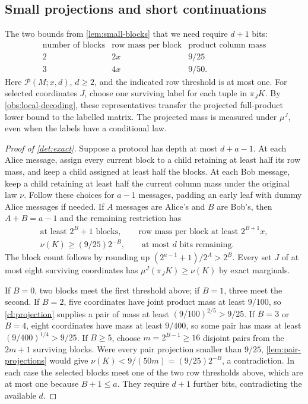 \documentclass[11pt]{article} \usepackage[utf8]{inputenc}
\theoremstyle{plain} \newtheorem{theorem}{Theorem}[section]
\theoremstyle{definition} \newaliascnt{definition}{theorem}
\newcommand{\RP}[3]{\mathcal{P}(#1;#2,#3)}
\begin{document}
\subsection{Small projections and short continuations}

The two bounds from \cref{lem:small-blocks} that we need require $d+1$ bits:
\[
\begin{array}{c|c|c}
\text{number of blocks}&\text{row mass per block}&\text{product column mass}\\
\hline
2&2x&9/25\\
3&4x&9/50.
\end{array}
\]
Here $\RP{M}{x}{d}$, $d\ge2$, and the indicated row threshold is at most
one. For selected coordinates $J$, choose one surviving label for each tuple
in $\pi_JK$. By \cref{obs:local-decoding}, these representatives transfer
the projected full-product lower bound to the labelled matrix. The projected
mass is measured under $\mu^J$, even when the labels have a conditional law.

\begin{proof}[Proof of \cref{det:exact}]
Suppose a protocol has depth at most $d+a-1$. At each Alice message,
assign every current block to a child retaining at least half its row mass,
and keep a child assigned at least half the blocks. At each Bob message,
keep a child retaining at least half the current column mass under the
original law $\nu$. Follow these choices for $a-1$ messages, padding an
early leaf with dummy Alice messages if needed. If $A$ messages are
Alice's and $B$ are Bob's, then $A+B=a-1$ and the remaining restriction has
\[
\begin{gathered}
\text{at least }2^B+1\text{ blocks},\qquad
\text{row mass per block at least }2^{B+1}x,\\
\nu(K)\ge(9/25)2^{-B},\qquad
\text{at most }d\text{ bits remaining}.
\end{gathered}
\]
The block count follows by rounding up
$(2^{a-1}+1)/2^A>2^B$. Every set $J$ of at most eight surviving coordinates
has $\mu^J(\pi_JK)\ge\nu(K)$ by exact marginals.

If $B=0$, two blocks meet the first threshold above; if $B=1$, three meet
the second. If $B=2$, five coordinates have joint product mass at least
$9/100$, so \cref{cl:projection} supplies a pair of mass at least
$(9/100)^{2/5}>9/25$. If $B=3$ or $B=4$, eight coordinates have mass at
least $9/400$, so some pair has mass at least $(9/400)^{1/4}>9/25$.
If $B\ge5$, choose $m=2^{B-1}\ge16$ disjoint pairs from the $2m+1$
surviving blocks. Were every pair projection smaller than $9/25$,
\cref{lem:pair-projections} would give
$\nu(K)<9/(50m)=(9/25)2^{-B}$, a contradiction.
In each case the selected blocks meet one of the two row thresholds above,
which are at most one because $B+1\le a$. They require $d+1$ further bits,
contradicting the available $d$.
\end{proof}
\end{document}

